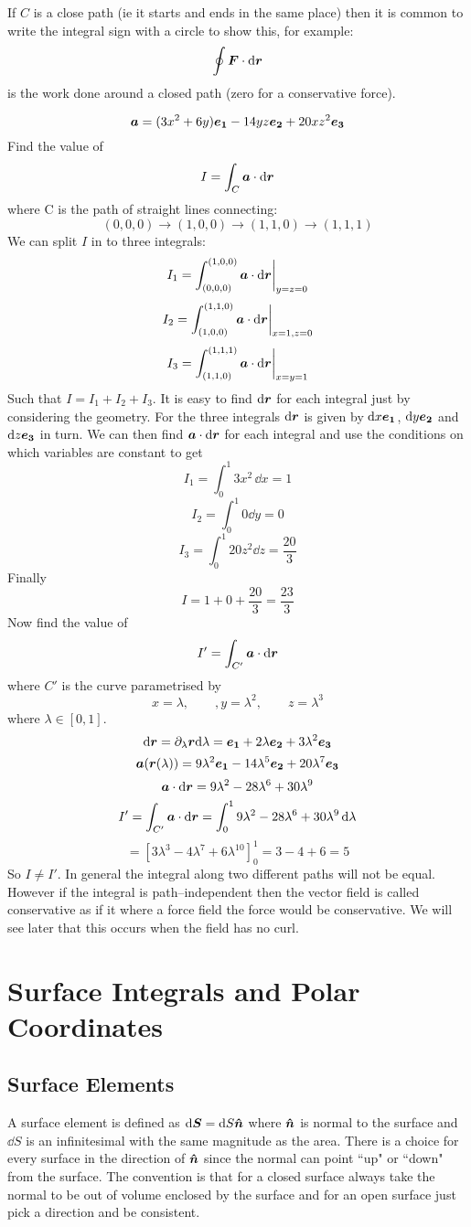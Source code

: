 \documentclass{article}
\begin{document}
    If \(C\) is a close path (ie it starts and ends in the same place) then it is common to write the integral sign with a circle to show this, for example:
    \[\oint\bm{F}\cdot\dd\bm{r}\]
    is the work done around a closed path (zero for a conservative force).
    
    \example
    \[\bm{a} = (3x^2 + 6y)\bm{e_{1}} - 14yz\bm{e_{2}} + 20xz^2\bm{e_{3}}\]
    Find the value of
    \[I = \int_C\bm{a}\cdot\dd\bm{r}\]
    where C is the path of straight lines connecting:
    \[(0, 0, 0)\to(1, 0, 0)\to(1, 1, 0)\to(1, 1, 1)\]
    We can split \(I\) in to three integrals:
    \[I_1 = \int_{(0, 0, 0)}^{(1, 0, 0)}\bm{a}\cdot\dd\bm{r}\biggr|_{y=z=0}\]
    \[I_2 = \int_{(1, 0, 0)}^{(1, 1, 0)}\bm{a}\cdot\dd\bm{r}\biggr|_{x=1,z=0}\]
    \[I_3 = \int_{(1, 1, 0)}^{(1, 1, 1)}\bm{a}\cdot\dd\bm{r}\biggr|_{x=y=1}\]
    Such that \(I = I_1 + I_2 + I_3\).
    It is easy to find \(\dd\bm{r}\) for each integral just by considering the geometry.
    For the three integrals \(\dd\bm{r}\) is given by \(\dd x\bm{e_{1}}\), \(\dd y\bm{e_{2}}\) and \(\dd z\bm{e_{3}}\) in turn.
    We can then find \(\bm{a}\cdot\dd\bm{r}\) for each integral and use the conditions on which variables are constant to get
    \[I_1 = \int_0^1 3x^2\,\dd x = 1\]
    \[I_2 = \int_0^1 0\dd y = 0\]
    \[I_3 = \int_0^1 20z^2\dd z = \frac{20}{3}\]
    Finally
    \[I = 1 + 0 + \frac{20}{3} = \frac{23}{3}\]
    Now find the value of
    \[I' = \int_{C'}\bm{a}\cdot\dd\bm{r}\]
    where \(C'\) is the curve parametrised by
    \[x = \lambda,\qquad, y = \lambda^2,\qquad z = \lambda^3\]
    where \(\lambda\in[0, 1]\).
    \[\dd\bm{r} = \partial_\lambda\bm{r}\dd\lambda = \bm{e_{1}} + 2\lambda\bm{e_{2}} + 3\lambda^2\bm{e_{3}}\]
    \[\bm{a}(\bm{r}(\lambda)) = 9\lambda^2\bm{e_{1}} - 14\lambda^5\bm{e_{2}} + 20\lambda^7\bm{e_{3}}\]
    \[\bm{a}\cdot\dd\bm{r} = 9\lambda^2 - 28\lambda^6 + 30\lambda^9\]
    \[I' = \int_{C'}\bm{a}\cdot\dd\bm{r} = \int_0^19\lambda^2 - 28\lambda^6 + 30\lambda^9\,\dd\lambda\]
    \[= \left[3\lambda^3 - 4\lambda^7 + 6\lambda^10\right]_0^1 = 3 - 4 + 6 = 5\]
    So \(I\ne I'\).
    In general the integral along two different paths will not be equal.
    However if the integral is path--independent then the vector field is called conservative as if it where a force field the force would be conservative.
    We will see later that this occurs when the field has no curl.
    
    \section{Surface Integrals and Polar Coordinates}
    \subsection{Surface Elements}
    A surface element is defined as \(\dd\bm{S} = \dd S\bm{\hat{n}}\) where \(\bm{\hat{n}}\) is normal to the surface and \(\dd S\) is an infinitesimal with the same magnitude as the area.
    There is a choice for every surface in the direction of \(\bm{\hat{n}}\) since the normal can point ``up" or ``down" from the surface.
    The convention is that for a closed surface always take the normal to be out of volume enclosed by the surface and for an open surface just pick a direction and be consistent.
    
\end{document}

